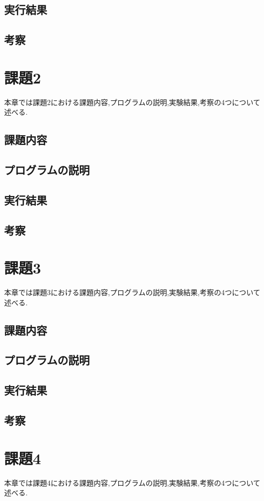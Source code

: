 \documentclass[a4j]{jarticle}
\begin{document}
    \subsection{実行結果}
    \subsection{考察}

    \section{課題2}
    本章では課題2における課題内容,プログラムの説明,実験結果,考察の4つについて述べる.
    \subsection{課題内容}
    \subsection{プログラムの説明}
    \subsection{実行結果}
    \subsection{考察}

    \section{課題3}
    本章では課題3における課題内容,プログラムの説明,実験結果,考察の4つについて述べる.
    \subsection{課題内容}
    \subsection{プログラムの説明}
    \subsection{実行結果}
    \subsection{考察}

    \section{課題4}
    本章では課題4における課題内容,プログラムの説明,実験結果,考察の4つについて述べる.
\end{document}

